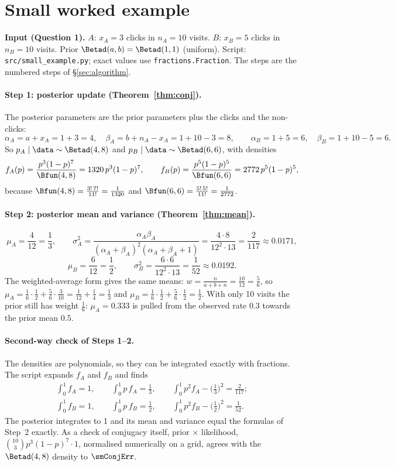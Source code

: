 \section{Small worked example}\label{sec:small}

\textbf{Input (Question 1).} $A$: $x_A=3$ clicks in $n_A=10$ visits. $B$: $x_B=5$ clicks in $n_B=10$ visits.
Prior $\Betad(a,b)=\Betad(1,1)$ (uniform). Script: \texttt{src/small\_example.py}; exact values use
\texttt{fractions.Fraction}. The steps are the numbered steps of \S\ref{sec:algorithm}.

\paragraph{Step 1: posterior update (Theorem~\ref{thm:conj}).}
The posterior parameters are the prior parameters plus the clicks and the non-clicks:
\[
\alpha_A=a+x_A=1+3=4,\quad \beta_A=b+n_A-x_A=1+10-3=8,\qquad
\alpha_B=1+5=6,\quad \beta_B=1+10-5=6 .
\]
So $p_A\mid\data\sim\Betad(4,8)$ and $p_B\mid\data\sim\Betad(6,6)$, with densities
\[
f_A(p)=\frac{p^{3}(1-p)^{7}}{\Bfun(4,8)}=1320\,p^3(1-p)^7,\qquad
f_B(p)=\frac{p^{5}(1-p)^{5}}{\Bfun(6,6)}=2772\,p^5(1-p)^5,
\]
because $\Bfun(4,8)=\frac{3!\,7!}{11!}=\frac1{1320}$ and $\Bfun(6,6)=\frac{5!\,5!}{11!}=\frac1{2772}$.

\paragraph{Step 2: posterior mean and variance (Theorem~\ref{thm:mean}).}
\[
\mu_A=\frac{4}{12}=\frac13,\qquad
\sigma_A^2=\frac{\alpha_A\beta_A}{(\alpha_A+\beta_A)^2(\alpha_A+\beta_A+1)}=\frac{4\cdot 8}{12^2\cdot 13}=\frac{2}{117}\approx0.0171,
\]
\[
\mu_B=\frac{6}{12}=\frac12,\qquad
\sigma_B^2=\frac{6\cdot 6}{12^2\cdot 13}=\frac{1}{52}\approx0.0192 .
\]
The weighted-average form gives the same means: $w=\frac{n}{a+b+n}=\frac{10}{12}=\frac56$, so
$\mu_A=\frac16\cdot\frac12+\frac56\cdot\frac3{10}=\frac1{12}+\frac14=\frac13$ and
$\mu_B=\frac16\cdot\frac12+\frac56\cdot\frac12=\frac12$. With only 10 visits the prior still has weight $\frac16$:
$\mu_A=0.333$ is pulled from the observed rate $0.3$ towards the prior mean $0.5$.

\paragraph{Second-way check of Steps 1--2.}
The densities are polynomials, so they can be integrated exactly with fractions. The script expands
$f_A$ and $f_B$ and finds
\begin{gather*}
\int_0^1 f_A=1,\qquad \int_0^1 p\,f_A=\tfrac13,\qquad \int_0^1 p^2f_A-\big(\tfrac13\big)^2=\tfrac2{117};\\
\int_0^1 f_B=1,\qquad \int_0^1 p\,f_B=\tfrac12,\qquad \int_0^1 p^2f_B-\big(\tfrac12\big)^2=\tfrac1{52}.
\end{gather*}
The posterior integrates to 1 and its mean and variance equal the formulas of Step~2 exactly. As a check of
conjugacy itself, prior $\times$ likelihood, $\binom{10}{3}p^3(1-p)^7\cdot 1$, normalised numerically on a grid,
agrees with the $\Betad(4,8)$ density to $\smConjErr$.

